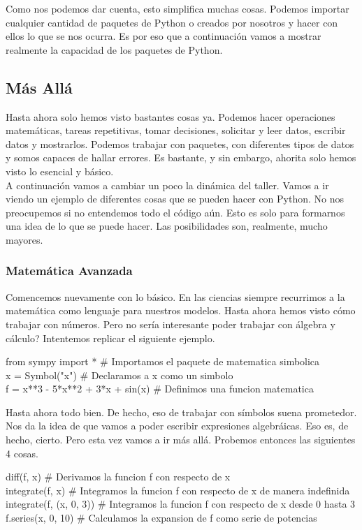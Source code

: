 \documentclass[10pt,letterpaper]{article}
\newenvironment{Code}
{
\begin{lrbox}{\selvestebox}%
\begin{minipage}{\dimexpr\columnwidth-2\fboxsep\relax}
\fontfamily{\ttdefault}\selectfont
}
{\end{minipage}\end{lrbox}%
\begin{center}
\colorbox{light-gray}{\usebox{\selvestebox}}
\end{center}
}
\begin{document}
Como nos podemos dar cuenta, esto simplifica muchas cosas. Podemos importar cualquier cantidad de paquetes de Python o creados por nosotros y hacer con ellos lo que se nos ocurra. Es por eso que a continuaci\'on vamos a mostrar realmente la capacidad de los paquetes de Python.

\subsection{M\'as All\'a}
Hasta ahora solo hemos visto bastantes cosas ya. Podemos hacer operaciones matem\'aticas, tareas repetitivas, tomar decisiones, solicitar y leer datos, escribir datos y mostrarlos. Podemos trabajar con paquetes, con diferentes tipos de datos y somos capaces de hallar errores. Es bastante, y sin embargo, ahorita solo hemos visto lo esencial y b\'asico.\\

A continuaci\'on vamos a cambiar un poco la din\'amica del taller. Vamos a ir viendo un ejemplo de diferentes cosas que se pueden hacer con Python. No nos preocupemos si no entendemos todo el c\'odigo a\'un. Esto es solo para formarnos una idea de lo que se puede hacer. Las posibilidades son, realmente, mucho mayores.

\subsubsection{Matem\'atica Avanzada}
Comencemos nuevamente con lo b\'asico. En las ciencias siempre recurrimos a la matem\'atica como lenguaje para nuestros modelos. Hasta ahora hemos visto c\'omo trabajar con n\'umeros. Pero no ser\'ia interesante poder trabajar con \'algebra y c\'alculo? Intentemos replicar el siguiente ejemplo.

\begin{Code}
from sympy import * \# Importamos el paquete de matematica simbolica\\
x = Symbol("x") \# Declaramos a x como un simbolo\\
f = x**3 - 5*x**2 + 3*x + sin(x) \# Definimos una funcion matematica
\end{Code}

Hasta ahora todo bien. De hecho, eso de trabajar con s\'imbolos suena prometedor. Nos da la idea de que vamos a poder escribir expresiones algebr\'aicas. Eso es, de hecho, cierto. Pero esta vez vamos a ir m\'as all\'a. Probemos entonces las siguientes 4 cosas.

\begin{Code}
diff(f, x) \# Derivamos la funcion f con respecto de x\\
integrate(f, x) \# Integramos la funcion f con respecto de x de manera indefinida\\
integrate(f, (x, 0, 3)) \# Integramos la funcion f con respecto de x desde 0 hasta 3\\
f.series(x, 0, 10) \# Calculamos la expansion de f como serie de potencias
\end{Code}
\end{document}
